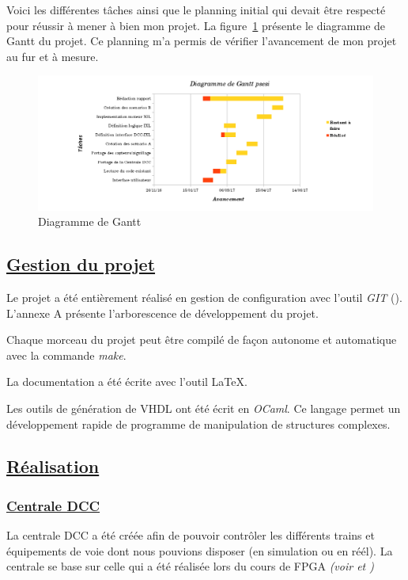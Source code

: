 Voici les différentes t\^aches ainsi que le planning initial qui devait être
respecté pour r\'eussir \`a mener \`a bien mon projet. La
figure~\ref{gantt} pr\'esente le diagramme de Gantt du projet. Ce planning m'a permis de vérifier l'avancement de mon projet au fur et à mesure.

\begin{figure}[h]
\centering
\includegraphics[scale=0.5]{gantt.png}
\caption{Diagramme de Gantt}
\label{gantt}
\end{figure}

\subsection{\underline{Gestion du projet}}
\label{sec:gestion}

Le projet a \'et\'e enti\`erement r\'ealis\'e en gestion de configuration avec l'outil \emph{GIT} (\cite{GIT}). L'annexe A pr\'esente l'arborescence de d\'eveloppement du projet.

Chaque morceau du projet peut \^etre compil\'e de fa\c con autonome et
automatique avec la commande \emph{make}.

La documentation a \'et\'e \'ecrite avec l'outil \LaTeX.

Les outils de g\'en\'eration de VHDL ont \'et\'e \'ecrit en \emph{OCaml}. Ce
langage permet un d\'eveloppement rapide de programme de manipulation de
structures complexes.


\subsection{\underline{Réalisation}}
\label{sec:Réal}

\subsubsection{\underline{Centrale DCC}}
\label{sec:Centrale}

La centrale DCC a été créée afin de pouvoir contrôler les
différents trains et équipements de voie dont nous pouvions
disposer (en simulation ou en réél).
\medskip
La centrale se base sur celle qui a été réalisée lors du cours de FPGA  \emph{(voir \cite{rapport} et \cite{sujet})}

